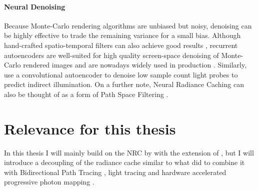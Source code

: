 \paragraph{Neural Denoising}
Because Monte-Carlo rendering algorithms are unbiased but noisy, denoising can be highly effective to trade the remaining variance for a small bias.
Although hand-crafted spatio-temporal filters can also achieve good results \parencite{schied2017}, recurrent autoencoders are well-suited for high quality screen-space denoising of Monte-Carlo rendered images \parencite{chaitanya2017} and are nowadays widely used in production \parencite{afra2019}.
Similarly, \textcite{jiang2020} use a convolutional autoencoder to denoise low sample count light probes to predict indirect illumination.
On a further note, Neural Radiance Caching \parencite{muller2021} can also be thought of as a form of Path Space Filtering \parencite{keller2016}. %

\section{Relevance for this thesis}
In this thesis I will mainly build on the NRC by \textcite{muller2021} with the extension of \textcite{muller2022}, but I will introduce a decoupling of the radiance cache similar to what \textcite{walter1999,tole2002} did to combine it with Bidirectional Path Tracing \parencite{veach1997}, light tracing \parencite{arvo1986} and hardware accelerated progressive photon mapping \parencite{jensen1996,kern2023,hachisuka2008}.